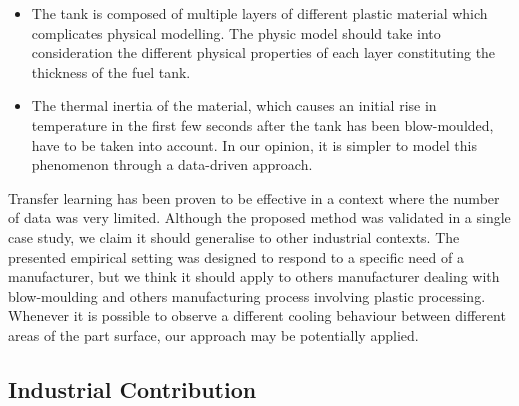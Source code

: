 \begin{itemize}
    \item The tank is composed of multiple layers of different plastic material which complicates physical modelling. The physic model should take into consideration the different physical properties of each layer constituting the thickness of the fuel tank.
    \item The thermal inertia of the material, which causes an initial rise in temperature in the first few seconds after the tank has been blow-moulded, have to be taken into account. In our opinion, it is simpler to model this phenomenon through a data-driven approach. 
\end{itemize}

Transfer learning has been proven to be effective in a context where the number of data was very limited. Although the proposed method was validated in a single case study, we claim it should generalise to other industrial contexts. The presented empirical setting was designed to respond to a specific need of a manufacturer, but we think it should apply to others manufacturer dealing with blow-moulding and others manufacturing process involving plastic processing. Whenever it is possible to observe a different cooling behaviour between different areas of the part surface, our approach may be potentially applied.


\subsection{Industrial Contribution}

